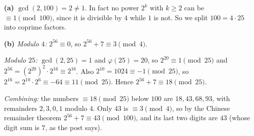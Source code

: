 \textbf{(a)} $\gcd(2,100)=2\ne1$. In fact no power $2^k$ with $k\ge2$ can be $\equiv1\pmod{100}$, since it is divisible by $4$ while $1$ is not. So we split $100=4\cdot25$ into coprime factors.

\textbf{(b)} \emph{Modulo $4$:} $2^{56}\equiv0$, so $2^{56}+7\equiv3\pmod 4$.

\emph{Modulo $25$:} $\gcd(2,25)=1$ and $\varphi(25)=20$, so $2^{20}\equiv1\pmod{25}$ and $2^{56}=\left(2^{20}\right)^2\cdot2^{16}\equiv2^{16}$. Also $2^{10}=1024\equiv-1\pmod{25}$, so $2^{16}=2^{10}\cdot2^6\equiv-64\equiv11\pmod{25}$. Hence $2^{56}+7\equiv18\pmod{25}$.

\emph{Combining:} the numbers $\equiv18\pmod{25}$ below $100$ are $18,43,68,93$, with remainders $2,3,0,1$ modulo $4$. Only $43$ is $\equiv3\pmod4$, so by the Chinese remainder theorem $2^{56}+7\equiv43\pmod{100}$, and its last two digits are $\boxed{43}$ (whose digit sum is $7$, as the post says).
